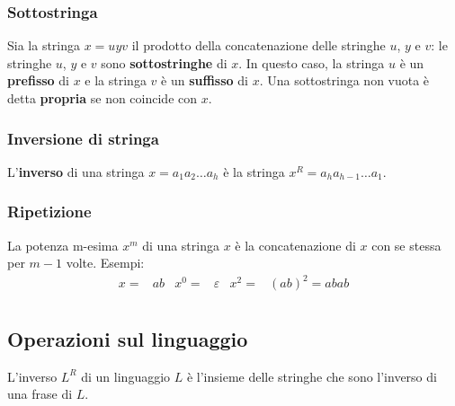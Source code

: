 \documentclass[11pt]{article}
\begin{document}
\subsubsection{Sottostringa}
Sia la stringa $x=uyv$ il prodotto della concatenazione delle stringhe $u$, $y$ e $v$: le stringhe $u$, $y$ e $v$ sono 
\textbf{sottostringhe} di $x$. In questo caso, la stringa $u$ è un \textbf{prefisso} di $x$ e la stringa $v$ è un 
\textbf{suffisso} di $x$. Una sottostringa non vuota è detta \textbf{propria} se non coincide con $x$.
\subsubsection{Inversione di stringa}
L'\textbf{inverso} di una stringa $x=a_1a_2\dots a_h$ è la stringa $x^R=a_ha_{h-1}\dots a_1$.
\subsubsection{Ripetizione}
La potenza m-esima $x^m$ di una stringa $x$ è la concatenazione di $x$ con se stessa per $m-1$ volte. Esempi:
\begin{align*}
    x=&ab    &   x^0=&\varepsilon    &   x^2=&(ab)^2=abab\\  
\end{align*}
\subsection{Operazioni sul linguaggio}
L'inverso $L^R$ di un linguaggio $L$ è l'insieme delle stringhe che sono l'inverso di una frase di $L$.
\end{document}
